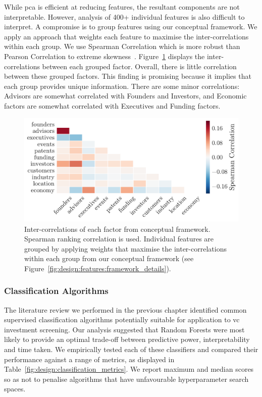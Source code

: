 \documentclass[../thesis/thesis.tex]{subfiles}
\begin{document}
While \gls{pca} is efficient at reducing features, the resultant components are not interpretable. However, analysis of 400+ individual features is also difficult to interpret. A compromise is to group features using our conceptual framework. We apply an approach that weights each feature to maximise the inter-correlations within each group. We use Spearman Correlation which is more robust than Pearson Correlation to extreme skewness~\cite{chok2010}. Figure~\ref{fig:design:grouped_heatmap} displays the inter-correlations between each grouped factor. Overall, there is little correlation between these grouped factors. This finding is promising because it implies that each group provides unique information. There are some minor correlations: Advisors are somewhat correlated with Founders and Investors, and Economic factors are somewhat correlated with Executives and Funding factors.

\begin{figure}[!htb]
    \centering
    \includegraphics[width=\textwidth]{../figures/design/distribution_correlations_grouped}
    \caption[Inter-correlations of factors from framework]{Inter-correlations of each factor from conceptual framework. Spearman ranking correlation is used. Individual features are grouped by applying weights that maximise the inter-correlations within each group from our conceptual framework (see Figure~\ref{fig:design:features:framework_details}).}
    \label{fig:design:grouped_heatmap}
\end{figure}

\subsubsection{Classification Algorithms}

The literature review we performed in the previous chapter identified common supervised classification algorithms potentially suitable for application to \gls{vc} investment screening. Our analysis suggested that Random Forests were most likely to provide an optimal trade-off between predictive power, interpretability and time taken. We empirically tested each of these classifiers and compared their performance against a range of metrics, as displayed in Table~\ref{fig:design:classification_metrics}. We report maximum and median scores so as not to penalise algorithms that have unfavourable hyperparameter search spaces.
\end{document}
